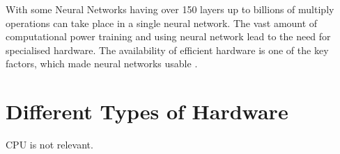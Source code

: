 \documentclass[conference]{IEEEtran}
\begin{document}
With some Neural Networks having over 150 layers \cite{densely_network} up to billions of multiply operations can take place in a single neural network. The vast amount of computational power training and using neural network lead to the need for specialised hardware. The availability of efficient hardware is one of the key factors, which made neural networks usable \cite{historyfpgas}.

  


\section{Different Types of Hardware}
CPU is not relevant.

\newpage
\quad
\newpage



\end{document}

